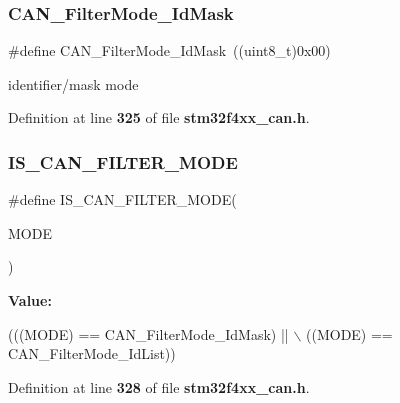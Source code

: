 \subsubsection{C\+A\+N\+\_\+\+Filter\+Mode\+\_\+\+Id\+Mask}
{\footnotesize\ttfamily \#define C\+A\+N\+\_\+\+Filter\+Mode\+\_\+\+Id\+Mask~((uint8\+\_\+t)0x00)}

identifier/mask mode 

Definition at line \textbf{ 325} of file \textbf{ stm32f4xx\+\_\+can.\+h}.

\mbox{\label{group__CAN__filter__mode_gae684565d5392c12fd333379e5ec840f8}} 
\subsubsection{I\+S\+\_\+\+C\+A\+N\+\_\+\+F\+I\+L\+T\+E\+R\+\_\+\+M\+O\+DE}
{\footnotesize\ttfamily \#define I\+S\+\_\+\+C\+A\+N\+\_\+\+F\+I\+L\+T\+E\+R\+\_\+\+M\+O\+DE(\begin{DoxyParamCaption}\item[{}]{M\+O\+DE }\end{DoxyParamCaption})}

{\bfseries Value\+:}
\begin{DoxyCode}
(((MODE) == CAN_FilterMode_IdMask) || \(\backslash\)
                                  ((MODE) == CAN_FilterMode_IdList))
\end{DoxyCode}


Definition at line \textbf{ 328} of file \textbf{ stm32f4xx\+\_\+can.\+h}.

